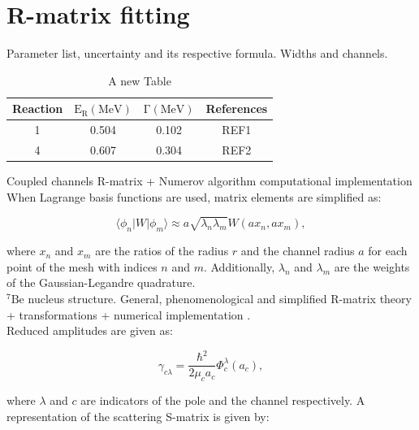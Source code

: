 \documentclass[openany]{book}
\begin{document}
\section{R-matrix fitting} \label{sec:rmatrixFitting}

Parameter list, uncertainty and its respective formula. Widths and channels.


\begin{table}[H]
	\centering
	\begin{tabular}{|c|c|c|c|}
		\hline
		Reaction & $\mathrm{E_R(MeV)}$ &  $\mathrm{\Gamma(MeV)}$ & References  \\  \hline
		1 &  0.504 & 0.102  & REF1  \\
 		4 &  0.607 & 0.304 & REF2 \\
 		\hline
	\end{tabular}
	\caption[R-matrix table]{A new Table}
	\label{table:fitting_rmatrix}
\end{table}

Coupled channels R-matrix + Numerov algorithm computational implementation \cite{descouvemont_2016}\\

When Lagrange basis functions are used, matrix elements are simplified as: 

\begin{equation}\label{eq:numericalRmatrix_elements}
	\langle \phi_n|  W| \phi_m \rangle \approx a \sqrt{\lambda_n\lambda_m} W(ax_n, ax_m),
\end{equation}

where $x_n$ and $x_m$ are the ratios of the radius $r$ and the channel radius $a$ for each point of the mesh with indices $n$ and $m$. Additionally, $\lambda_n$ and $\lambda_m$ are the weights of the Gaussian-Legandre quadrature.\\

 $\mathrm{{}^{7}Be}$ nucleus structure. General, phenomenological and simplified R-matrix theory 
 + transformations + numerical implementation \cite{thompson_deboer_dimitriou_kunieda_pigni_arbanas_leeb_srdinko_hale_tamagno_et_2019}. \\
 
 Reduced amplitudes are given as:
 
 \begin{equation}\label{eq:numericalRmatrix_gamma}
 	\gamma_{c\lambda} = \frac{\hbar^2}{2\mu_ca_c}\Phi^{\lambda}_{c}(a_c),
 \end{equation}

where $\lambda$ and $c$ are indicators of the pole and the channel respectively. A representation of the scattering S-matrix is given by:
\end{document}
